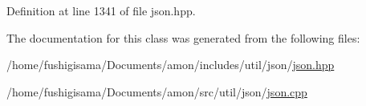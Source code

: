 Definition at line 1341 of file json.\-hpp.



The documentation for this class was generated from the following files\-:\begin{DoxyCompactItemize}
\item 
/home/fushigisama/\-Documents/amon/includes/util/json/\hyperlink{json_8hpp}{json.\-hpp}\item 
/home/fushigisama/\-Documents/amon/src/util/json/\hyperlink{json_8cpp}{json.\-cpp}\end{DoxyCompactItemize}
